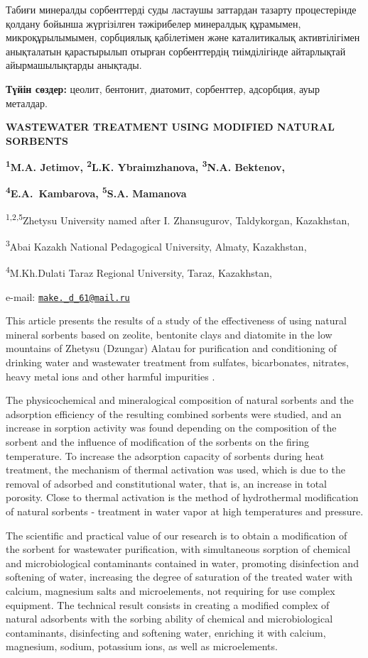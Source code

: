 Табиғи минералды сорбенттерді суды ластаушы заттардан тазарту
процестерінде қолдану бойынша жүргізілген тәжірибелер минералдық
құрамымен, микроқұрылымымен, сорбциялық қабілетімен және каталитикалық
активтілігімен анықталатын қарастырылып отырған сорбенттердің
тиімділігінде айтарлықтай айырмашылықтарды анықтады.

{\bfseries Түйін сөздер:} цеолит, бентонит, диатомит, сорбенттер,
адсорбция, ауыр металдар.

{\bfseries WASTEWATER TREATMENT USING MODIFIED NATURAL SORBENTS}

{\bfseries \textsuperscript{1}M.A. Jetimov\textsuperscript{\envelope },
\textsuperscript{2}L.K. Ybraimzhanova, \textsuperscript{3}N.A.
Bektenov,}

{\bfseries \textsuperscript{4}E.A.~Kambarova, \textsuperscript{5}S.A.
Mamanova}

\textsuperscript{1,2,5}Zhetysu University named after I. Zhansugurov,
Taldykorgan, Kazakhstan,

\textsuperscript{3}Abai Kazakh National Pedagogical University, Almaty,
Kazakhstan,

\textsuperscript{4}M.Kh.Dulati Taraz Regional University, Taraz,
Kazakhstan,

e-mail:
\href{mailto:make._d_61@mail.ru}{\nolinkurl{make.\_d\_61@mail.ru}}

This article presents the results of a study of the effectiveness of
using natural mineral sorbents based on zeolite, bentonite clays and
diatomite in the low mountains of Zhetysu (Dzungar) Alatau for
purification and conditioning of drinking water and wastewater treatment
from sulfates, bicarbonates, nitrates, heavy metal ions and other
harmful impurities .

The physicochemical and mineralogical composition of natural sorbents
and the adsorption efficiency of the resulting combined sorbents were
studied, and an increase in sorption activity was found depending on the
composition of the sorbent and the influence of modification of the
sorbents on the firing temperature. To increase the adsorption capacity
of sorbents during heat treatment, the mechanism of thermal activation
was used, which is due to the removal of adsorbed and constitutional
water, that is, an increase in total porosity. Close to thermal
activation is the method of hydrothermal modification of natural
sorbents - treatment in water vapor at high temperatures and pressure.

The scientific and practical value of our research is to obtain a
modification of the sorbent for wastewater purification, with
simultaneous sorption of chemical and microbiological contaminants
contained in water, promoting disinfection and softening of water,
increasing the degree of saturation of the treated water with calcium,
magnesium salts and microelements, not requiring for use complex
equipment. The technical result consists in creating a modified complex
of natural adsorbents with the sorbing ability of chemical and
microbiological contaminants, disinfecting and softening water,
enriching it with calcium, magnesium, sodium, potassium ions, as well as
microelements.


